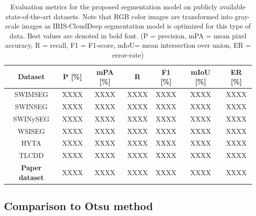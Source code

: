 \documentclass[amt, article]{copernicus}
\begin{document}
\begin{table}[t]
    \begin{center}
        \caption{Evaluation metrics for the proposed segmentation model on publicly available state-of-the-art datasets. Note that RGB color images are transformed into gray-scale images as IRIS-CloudDeep segmentation model is optimized for this type of data. Best values are denoted in bold font. (P = precision, mPA = mean pixel accuracy, R = recall, F1 = F1-score, mIoU= mean intersection over union, ER = error-rate)}
        \begin{tabular}{c c c c c c c} 
        \tophline \hline
         Dataset & P [\%] & mPA [\%] & R & F1 [\%] & mIoU [\%] & ER [\%] \\ [1.0ex]
         \hline
         SWIMSEG & XXXX & XXXX & XXXX & XXXX & XXXX & XXXX \\ [1.0ex]
         SWINSEG & XXXX & XXXX & XXXX & XXXX & XXXX & XXXX \\ [1.0ex]
         SWINySEG & XXXX & XXXX & XXXX & XXXX & XXXX & XXXX \\ [1.0ex]
         WSISEG & XXXX & XXXX & XXXX & XXXX & XXXX & XXXX \\ [1.0ex]
         HYTA & XXXX & XXXX & XXXX & XXXX & XXXX & XXXX \\ [1.0ex]
         TLCDD & XXXX & XXXX & XXXX & XXXX & XXXX & XXXX \\ [1.0ex]
         \textbf{Paper dataset} & XXXX & XXXX & XXXX & XXXX & XXXX & XXXX \\
         \hline
        \end{tabular}
        \belowtable{}
        \end{center}
    \end{table}

\subsection{Comparison to Otsu method}
\end{document}
